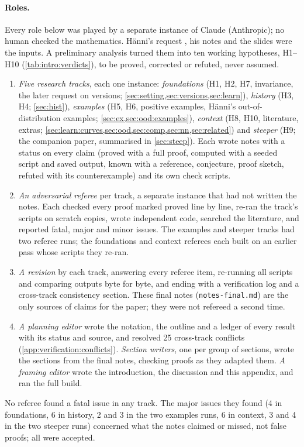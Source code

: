 \paragraph{Roles.} Every role below was played by a separate instance of Claude (Anthropic); no human checked the mathematics. H\"anni's request \citep{hanni2026request}, his notes \citep{hanni2026notes} and the slides \citep{vaintrobhanni2026nnbayes} were the inputs. A preliminary analysis turned them into ten working hypotheses, H1--H10 (\cref{tab:intro:verdicts}), to be proved, corrected or refuted, never assumed.
\begin{enumerate}[leftmargin=*]
\item \emph{Five research tracks}, each one instance: \emph{foundations} (H1, H2, H7, invariance, the later request on versions; \cref{sec:setting,sec:versions,sec:learn}), \emph{history} (H3, H4; \cref{sec:hist}), \emph{examples} (H5, H6, positive examples, H\"anni's out-of-distribution examples; \cref{sec:ex,sec:ood:examples}), \emph{context} (H8, H10, literature, extras; \cref{sec:learn:curves,sec:ood,sec:comp,sec:nn,sec:related}) and \emph{steeper} (H9; the companion paper, summarised in \cref{sec:steep}). Each wrote notes with a status on every claim (proved with a full proof, computed with a seeded script and saved output, known with a reference, conjecture, proof sketch, refuted with its counterexample) and its own check scripts.
\item \emph{An adversarial referee} per track, a separate instance that had not written the notes. Each checked every proof marked proved line by line, re-ran the track's scripts on scratch copies, wrote independent code, searched the literature, and reported fatal, major and minor issues. The examples and steeper tracks had two referee runs; the foundations and context referees each built on an earlier pass whose scripts they re-ran.
\item \emph{A revision} by each track, answering every referee item, re-running all scripts and comparing outputs byte for byte, and ending with a verification log and a cross-track consistency section. These final notes (\texttt{notes-final.md}) are the only sources of claims for the paper; they were not refereed a second time.
\item \emph{A planning editor} wrote the notation, the outline and a ledger of every result with its status and source, and resolved 25 cross-track conflicts (\cref{app:verification:conflicts}). \emph{Section writers}, one per group of sections, wrote the sections from the final notes, checking proofs as they adapted them. \emph{A framing editor} wrote the introduction, the discussion and this appendix, and ran the full build.
\end{enumerate}
No referee found a fatal issue in any track. The major issues they found (4 in foundations, 6 in history, 2 and 3 in the two examples runs, 6 in context, 3 and 4 in the two steeper runs) concerned what the notes claimed or missed, not false proofs; all were accepted.

